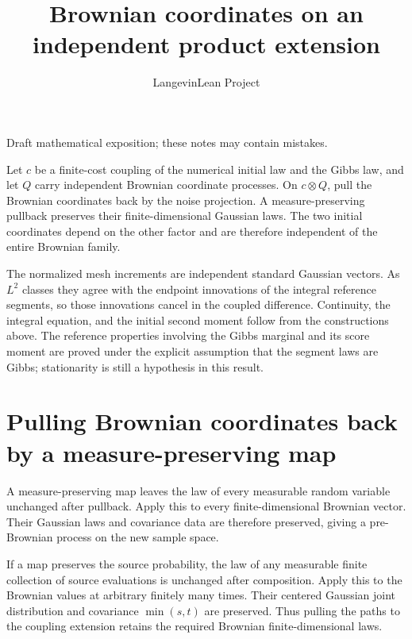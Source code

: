 \documentclass[11pt,a4paper]{article}
\title{\texorpdfstring{Brownian coordinates on an independent product extension}{Brownian coordinates on an independent product extension}}
\author{LangevinLean Project}
\date{}
\begin{document}
\maketitle
Draft mathematical exposition; these notes may contain mistakes.


Let \(c\) be a finite-cost coupling of the numerical initial law and the Gibbs law, and let \(Q\) carry independent Brownian coordinate processes. On \(c\otimes Q\), pull the Brownian coordinates back by the noise projection. A measure-preserving pullback preserves their finite-dimensional Gaussian laws. The two initial coordinates depend on the other factor and are therefore independent of the entire Brownian family.



The normalized mesh increments are independent standard Gaussian vectors. As \(L^2\) classes they agree with the endpoint innovations of the integral reference segments, so those innovations cancel in the coupled difference. Continuity, the integral equation, and the initial second moment follow from the constructions above. The reference properties involving the Gibbs marginal and its score moment are proved under the explicit assumption that the segment laws are Gibbs; stationarity is still a hypothesis in this result.


\section{\texorpdfstring{Pulling Brownian coordinates back by a measure-preserving map}{Pulling Brownian coordinates back by a measure-preserving map}}


A measure-preserving map leaves the law of every measurable random variable unchanged after pullback. Apply this to every finite-dimensional Brownian vector. Their Gaussian laws and covariance data are therefore preserved, giving a pre-Brownian process on the new sample space.



If a map preserves the source probability, the law of any measurable finite collection of source evaluations is unchanged after composition. Apply this to the Brownian values at arbitrary finitely many times. Their centered Gaussian joint distribution and covariance \(\min(s,t)\) are preserved. Thus pulling the paths to the coupling extension retains the required Brownian finite-dimensional laws.
\end{document}
